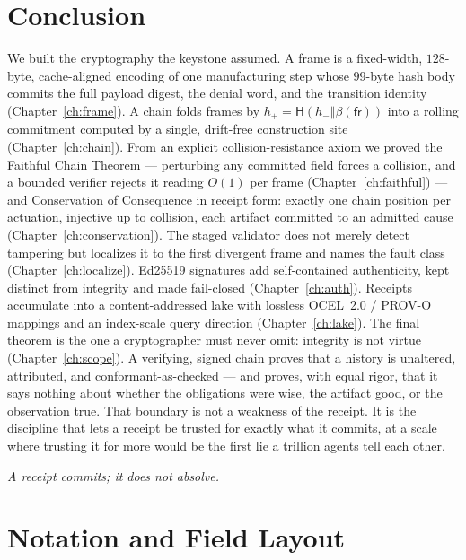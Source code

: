 \documentclass[11pt,oneside]{book}
\theoremstyle{definition}
\theoremstyle{plain}
\theoremstyle{remark}
\newcommand{\chainH}{\mathsf{H}}               %
\newcommand{\fr}{\mathsf{fr}}                   %
\newcommand{\body}{\beta}                       %
\newcommand{\concat}{\mathbin{\Vert}}           %
\begin{document}
\chapter{Conclusion}

We built the cryptography the keystone assumed. %
A frame is a fixed-width, $128$-byte,
cache-aligned encoding of one manufacturing step whose $99$-byte hash body commits the full
payload digest, the denial word, and the transition identity (Chapter~\ref{ch:frame}). %
A chain
folds frames by $h_{+}=\chainH(h_{-}\concat\body(\fr))$ into a rolling commitment computed by a
single, drift-free construction site (Chapter~\ref{ch:chain}). %
From an explicit
collision-resistance axiom we proved the Faithful Chain Theorem --- perturbing any committed
field forces a collision, and a bounded verifier rejects it reading $O(1)$ per frame
(Chapter~\ref{ch:faithful}) --- and Conservation of Consequence in receipt form: exactly one
chain position per actuation, injective up to collision, each artifact committed to an admitted
cause (Chapter~\ref{ch:conservation}). %
The staged validator does not merely detect tampering
but localizes it to the first divergent frame and names the fault class
(Chapter~\ref{ch:localize}). %
Ed25519 signatures add self-contained authenticity, kept
distinct from integrity and made fail-closed (Chapter~\ref{ch:auth}). %
Receipts accumulate into
a content-addressed lake with lossless OCEL~2.0 / PROV-O mappings and an index-scale query
direction (Chapter~\ref{ch:lake}). %
The final theorem is the one a cryptographer must never omit: integrity is not virtue
(Chapter~\ref{ch:scope}). %
A verifying, signed chain proves that a history is unaltered,
attributed, and conformant-as-checked --- and proves, with equal rigor, that it says nothing
about whether the obligations were wise, the artifact good, or the observation true. %
That
boundary is not a weakness of the receipt. %
It is the discipline that lets a receipt be trusted
for exactly what it commits, at a scale where trusting it for more would be the first lie a
trillion agents tell each other. %

\begin{center}\itshape A receipt commits; it does not absolve. %
\end{center}

\appendix %
\chapter{Notation and Field Layout}
\end{document}
